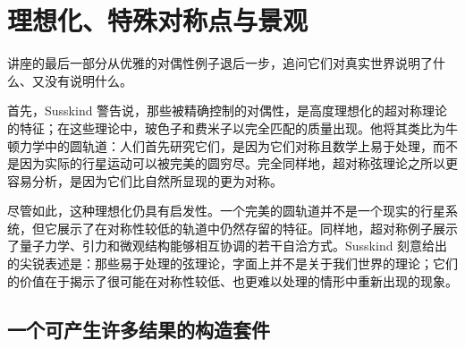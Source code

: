 \begin{classroomqa}
\end{classroomqa}

\begin{classroomqa}
\end{classroomqa}

\begin{classroomqa}
\end{classroomqa}

\section{理想化、特殊对称点与景观}

讲座的最后一部分从优雅的对偶性例子退后一步，追问它们对真实世界说明了什么、又没有说明什么。

首先，Susskind 警告说，那些被精确控制的对偶性，是高度理想化的超对称理论的特征；在这些理论中，玻色子和费米子以完全匹配的质量出现。他将其类比为牛顿力学中的圆轨道：人们首先研究它们，是因为它们对称且数学上易于处理，而不是因为实际的行星运动可以被完美的圆穷尽。完全同样地，超对称弦理论之所以更容易分析，是因为它们比自然所显现的更为对称。

尽管如此，这种理想化仍具有启发性。一个完美的圆轨道并不是一个现实的行星系统，但它展示了在对称性较低的轨道中仍然存留的特征。同样地，超对称例子展示了量子力学、引力和微观结构能够相互协调的若干自洽方式。Susskind 刻意给出的尖锐表述是：那些易于处理的弦理论，字面上并不是关于我们世界的理论；它们的价值在于揭示了很可能在对称性较低、也更难以处理的情形中重新出现的现象。

\subsection{一个可产生许多结果的构造套件}

